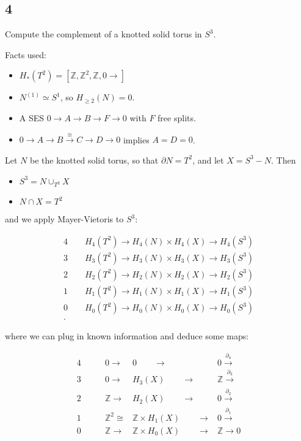 \hypertarget{section-8}{%
\subsection{4}\label{section-8}}

Compute the complement of a knotted solid torus in \(S^3\).

\begin{solution}

Facts used:

\begin{itemize}
\tightlist
\item
  \(H_*(T^2) = [{\mathbb{Z}}, {\mathbb{Z}}^2, {\mathbb{Z}}, 0\rightarrow]\)
\item
  \(N^{(1)} \simeq S^1\), so \(H_{\geq 2}(N) = 0\).
\item
  A SES \(0\to A\to B \to F \to 0\) with \(F\) free splits.
\item
  \(0\to A \to B \xrightarrow{\cong} C \to D \to 0\) implies
  \(A = D = 0\).
\end{itemize}

Let \(N\) be the knotted solid torus, so that \({\partial}N = T^2\), and
let \(X = S^3 - N\). Then

\begin{itemize}
\tightlist
\item
  \(S^3 = N \cup_{T^2} X\)
\item
  \(N \cap X = T^2\)
\end{itemize}

and we apply Mayer-Vietoris to \(S^3\):

\begin{align*} 4\qquad H_4(T^2) \to H_4(N) \times H_4(X) \to H_4(S^3) \\ 3\qquad H_3(T^2) \to H_3(N) \times H_3(X) \to H_3(S^3) \\ 2\qquad H_2(T^2) \to H_2(N) \times H_2(X) \to H_2(S^3) \\ 1\qquad H_1(T^2) \to H_1(N) \times H_1(X) \to H_1(S^3) \\ 0\qquad H_0(T^2) \to H_0(N) \times H_0(X) \to H_0(S^3) \\ .\end{align*}

where we can plug in known information and deduce some maps:

\begin{align} 4\qquad &0 \to &0 \qquad\to &0 \xrightarrow{{\partial}_4} \\ 3\qquad &0 \to &H_3(X) \qquad\to &{\mathbb{Z}}\xrightarrow{{\partial}_3}\\ 2\qquad &{\mathbb{Z}}\to &H_2(X) \qquad\to &0 \xrightarrow{{\partial}_2}\\ 1\qquad &{\mathbb{Z}}^2 \cong &{\mathbb{Z}}\times H_1(X) \qquad\to &0 \xrightarrow{{\partial}_1}\\ 0\qquad &{\mathbb{Z}}\to &{\mathbb{Z}}\times H_0(X) \qquad\to &{\mathbb{Z}}\to 0 \\ \end{align}


\end{solution}
